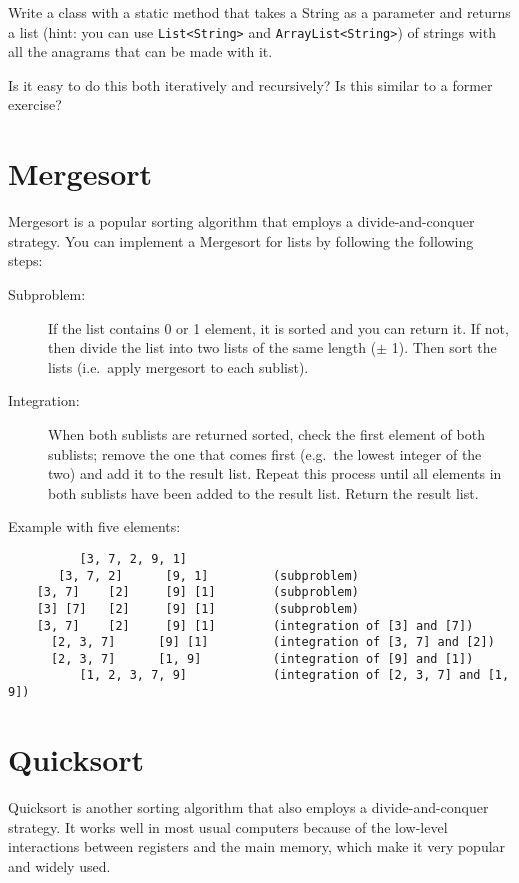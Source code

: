 \documentclass{article}
\begin{document}
Write a class with a static method that takes a String as a parameter
and returns a list (hint: you can use \verb+List<String>+ and
\verb+ArrayList<String>+) of strings with all the anagrams that can be
made with it. 

Is it easy to do this both iteratively and recursively? Is this
similar to a former exercise?

\section{Mergesort}
\label{sec:mergesort}

Mergesort is a popular sorting algorithm that employs a
divide-and-conquer strategy. You can implement a Mergesort for lists
by following the following steps: 

\begin{description}
\item[Subproblem: ] If the list contains 0 or 1 element, it is sorted
  and you can return it. If not, then divide the list into two lists
  of the same length ($\pm$ 1). Then sort the lists (i.e.~apply
  mergesort to each sublist).
\item[Integration: ] When both sublists are returned sorted, check the
  first element of both sublists; remove the one that comes first
  (e.g.~the lowest integer of the two) and add it to the result
  list. Repeat this process until all elements in both sublists have
  been added to the result list. Return the result list. 
\end{description}

Example with five elements: 

\begin{verbatim}
          [3, 7, 2, 9, 1]            
       [3, 7, 2]      [9, 1]         (subproblem)
    [3, 7]    [2]     [9] [1]        (subproblem)
    [3] [7]   [2]     [9] [1]        (subproblem)
    [3, 7]    [2]     [9] [1]        (integration of [3] and [7])
      [2, 3, 7]      [9] [1]         (integration of [3, 7] and [2])
      [2, 3, 7]      [1, 9]          (integration of [9] and [1])
          [1, 2, 3, 7, 9]            (integration of [2, 3, 7] and [1, 9])
\end{verbatim}

\section{Quicksort}
\label{sec:quicksort}

Quicksort is another sorting algorithm that also employs a
divide-and-conquer strategy. It works well in most usual computers
because of the low-level interactions between registers and the main
memory, which make it very popular and widely used. 
\end{document}
